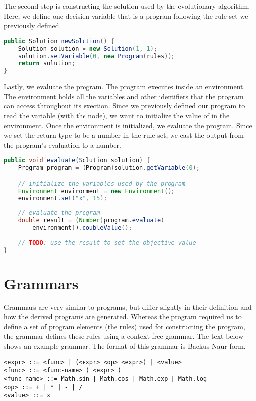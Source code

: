 The second step is constructing the solution used by the evolutionary algorithm.  Here, we define one decision variable that is a program following the rule set we previously defined.
\begin{lstlisting}[language=Java]
public Solution newSolution() {
    Solution solution = new Solution(1, 1);
    solution.setVariable(0, new Program(rules));
    return solution;
}
\end{lstlisting}

Lastly, we evaluate the program.  The program executes inside an environment.  The environment holds all the variables and other identifiers that the program can access throughout its exection.  Since we previously defined our program to read the variable  (with the  node), we want to initialize the value of  in the environment.  Once the environment is initialized, we evaluate the program.  Since we set the return type to be a number in the rule set, we cast the output from the program's evaluation to a number.
\begin{lstlisting}[language=Java]
public void evaluate(Solution solution) {
    Program program = (Program)solution.getVariable(0);

    // initialize the variables used by the program
    Environment environment = new Environment();
    environment.set("x", 15);
    
    // evaluate the program
    double result = (Number)program.evaluate(
        environment)).doubleValue();
        
    // TODO: use the result to set the objective value
}
\end{lstlisting}

\section{Grammars}
Grammars are very similar to programs, but differ slightly in their definition and how the derived programs are generated.  Whereas the program required us to define a set of program elements (the rules) used for constructing the program, the grammar defines these rules using a context free grammar.  The text below shows an example grammar.  The format of this grammar is Backus-Naur form.
\begin{lstlisting}[language=Plaintext]
<expr> ::= <func> | (<expr> <op> <expr>) | <value>
<func> ::= <func-name> ( <expr> )
<func-name> ::= Math.sin | Math.cos | Math.exp | Math.log
<op> ::= + | * | - | /
<value> ::= x
\end{lstlisting}

